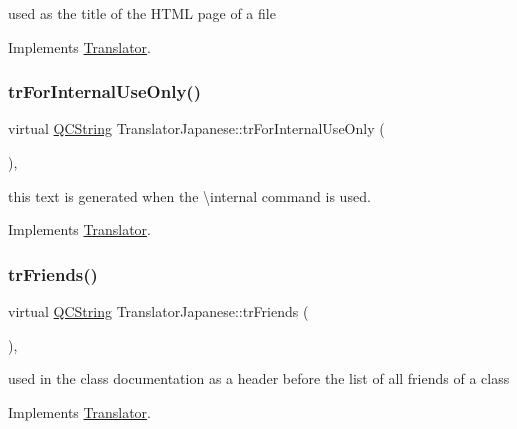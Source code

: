 used as the title of the H\+T\+ML page of a file 

Implements \mbox{\hyperlink{class_translator}{Translator}}.

\mbox{\label{class_translator_japanese_a2436d088680bf91099d64e05b07367b2}} 
\subsubsection{\texorpdfstring{trForInternalUseOnly()}{trForInternalUseOnly()}}
{\footnotesize\ttfamily virtual \mbox{\hyperlink{class_q_c_string}{Q\+C\+String}} Translator\+Japanese\+::tr\+For\+Internal\+Use\+Only (\begin{DoxyParamCaption}{ }\end{DoxyParamCaption})\hspace{0.3cm}{\ttfamily [inline]}, {\ttfamily [virtual]}}

this text is generated when the \textbackslash{}internal command is used. 

Implements \mbox{\hyperlink{class_translator}{Translator}}.

\mbox{\label{class_translator_japanese_a92fb4864a83ece67254ab57745316676}} 
\subsubsection{\texorpdfstring{trFriends()}{trFriends()}}
{\footnotesize\ttfamily virtual \mbox{\hyperlink{class_q_c_string}{Q\+C\+String}} Translator\+Japanese\+::tr\+Friends (\begin{DoxyParamCaption}{ }\end{DoxyParamCaption})\hspace{0.3cm}{\ttfamily [inline]}, {\ttfamily [virtual]}}

used in the class documentation as a header before the list of all friends of a class 

Implements \mbox{\hyperlink{class_translator}{Translator}}.

\mbox{\label{class_translator_japanese_aeaf830e54de627a69c9fac87f3002826}} 
